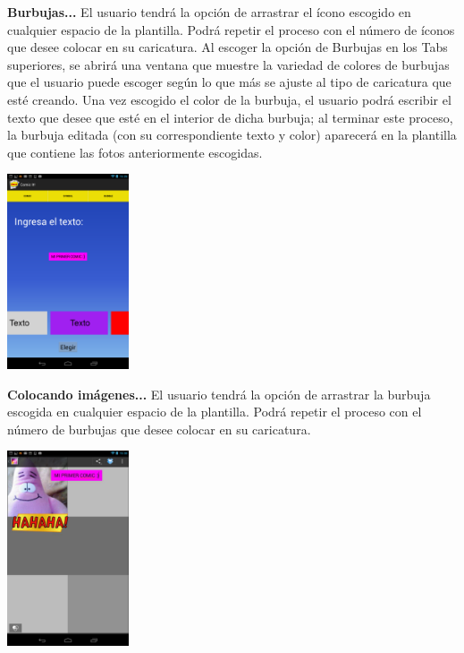 \documentclass[12pt]{report}
\begin{document}
\begingroup
		\large{
			\textbf{
				Burbujas...
				\newline
				\newline
			}
		}
	\endgroup
El usuario tendrá la opción de arrastrar el ícono escogido en cualquier espacio de la plantilla. Podrá repetir el proceso con el número de íconos que desee colocar en su caricatura.
Al escoger la opción de Burbujas en los Tabs superiores, se abrirá una ventana que muestre la variedad de colores de burbujas que el usuario puede escoger según lo que más se ajuste al tipo de caricatura que esté creando. Una vez escogido el color de la burbuja, el usuario podrá escribir el texto que desee que esté en el interior de dicha burbuja; al terminar este proceso, la burbuja editada (con su correspondiente texto y color) aparecerá en la plantilla que contiene las fotos anteriormente escogidas.

	\begin{center}
		\begingroup
			\includegraphics[width=0.27\textwidth]{imagenes_usuario/texto.png}
		\endgroup
	\end{center}



\begingroup
		\large{
			\textbf{
				Colocando imágenes...
				\newline
				\newline
			}
		}
	\endgroup
El usuario tendrá la opción de arrastrar la burbuja escogida en cualquier espacio de la plantilla. Podrá repetir el proceso con el número de burbujas que desee colocar en su caricatura.
\newline


	\begin{center}
		\begingroup
			\includegraphics[width=0.27\textwidth]{imagenes_usuario/comic.png}
		\endgroup
	\end{center}
\end{document}
